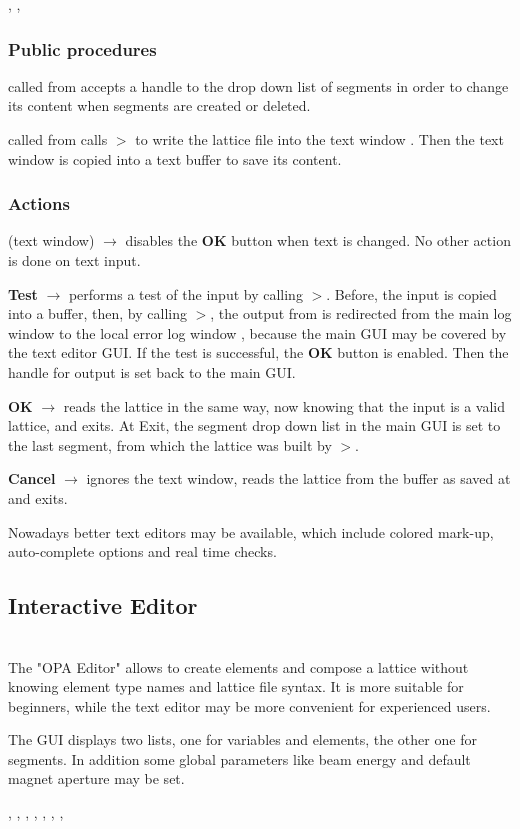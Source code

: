 \documentclass[12pt]{article}
\newcommand\code[1]{{\tt #1}}
\newcommand{\ofld}[1]{\colorbox{black!15}{{{\color{black}\bf #1}}}}
\newcommand{\ofldx}[1]{\colorbox{black!15}{{\color{black}(#1)}}}
\newcommand\guico[1]{{\color{blue}\code{#1}}}
\newcommand{\unico}[1]{{\color{burntorange}\code{#1}}}
\newcommand{\evcod}[2]{\ofld{#1} $\rightarrow$ \guico{#2}}
\newcommand{\evcodx}[2]{\ofldx{#1} $\rightarrow$ \guico{#2}}
\newcommand{\prcod}[2]{\opauni{#1}$>$\unico{#2}}
\newcommand{\opagui}[1]{\colorbox{blue!20}{{\color{black}\code{#1}}}}
\newcommand{\oguih}[2]{\subsection{\label{#2}#1}{\Huge\opagui{#2}}\\}
\newcommand{\ogui}[1]{\hyperref[#1]{\opagui{#1}}}
\newcommand{\opauni}[1]{\colorbox{orange!30}{{\color{black}\code{#1}}}}
\newcommand{\ouni}[1]{\hyperref[#1]{\opauni{#1}}}
\newcommand{\uses}[1]{\flushleft {\bf Uses:} #1}
\newcommand{\act}[1]{\subsubsection*{Actions} #1}
\newcommand{\ppro}[1]{\subsubsection*{Public procedures} #1}
\newcommand{\todo}[1]{{\color{red} #1}}
\begin{document}
\uses{\ouni{globlib}, \ouni{editorlib}, \ouni{latfilelib}}

\ppro{
\guico{Init} called from \ogui{opamenu} accepts a handle to the drop down list of segments in order to change its content when segments are created or deleted.

\guico{LoadLattice} called from \ogui{opamenu} calls \prcod{latfilelib}{WriteLattice} to write the lattice file into the text window \guico{EdtWin}. Then the text window is copied into a text buffer to save its content.
}

\act{
\evcodx{text window}{disableOKBut} disables the \ofld{OK} button when text is changed. No other action is done on text input.

\evcod{Test}{filetest} performs a test of the input by calling \prcod{latfilelib}{LatRead}. Before, the input is copied into a buffer, then, by calling \prcod{globlib}{PassErrLogHandle}, the output from \unico{LatRead} is redirected from the \ogui{opamenu} main log window to the local error log window \guico{myerrlog}, because the main GUI may be covered by the text editor GUI. If the test is successful, the \ofld{OK} button is enabled. Then the handle for output is set back to the main GUI.


\evcod{OK}{fileget} reads the lattice in the same way, now knowing that the input is a valid lattice, and exits. At Exit, the segment drop down list in the main GUI is set to the last segment, from which the lattice was built by \prcod{latfilelib}{LatRead}.

\evcod{Cancel}{fileRestore} ignores the text window, reads the lattice from the buffer as saved at \guico{Init} and exits.

}

\todo{Nowadays better text editors may be available, which include colored mark-up, auto-complete options and real time checks.}

\oguih{Interactive Editor}{opaeditor}

The "OPA Editor" allows to create elements and compose a lattice without knowing element type names and lattice file syntax. It is more suitable for beginners, while the text editor may be more convenient for experienced users.

The GUI displays two lists, one for variables and elements, the other one for segments. In addition some global parameters like beam energy and default magnet aperture may be set.

\uses{\ouni{globlib}, \ouni{editorlib}, \ouni{varlib}, \ogui{oelecreate}, \ogui{oeleedit}, \ogui{osegedit}, \ouni{editorlib}, \ouni{comauxlib}}
\end{document}
